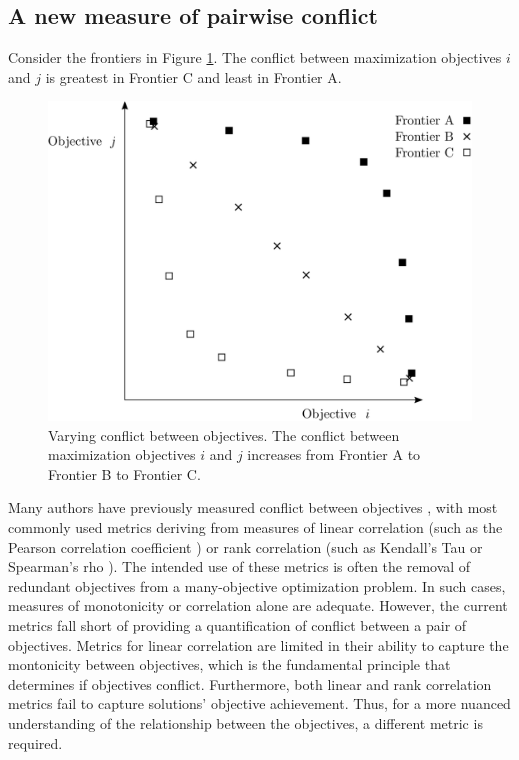 \subsection{A new measure of pairwise conflict}
\label{sec:newConflictMetric}
Consider the frontiers in Figure \ref{fig:ConflictVariesExample}. The conflict between maximization objectives $i$ and $j$ is greatest in Frontier C and least in Frontier A.
\begin{figure}[ht]
\centering
\includegraphics[width=.6\textwidth]{../images/ConflictVariesExample}
\caption[Example of varying conflict between objectives]{Varying conflict between objectives. The conflict between maximization objectives $i$ and $j$ increases from Frontier A to Frontier B to Frontier C.}
\label{fig:ConflictVariesExample}
\end{figure}

Many authors have previously measured conflict between objectives \cite{brockhoff2009objective}\cite{purshouse2003conflict}\cite{gal1977redundant}, with most commonly used metrics deriving from measures of linear correlation (such as the Pearson correlation coefficient \cite{deb2006searching}) or rank correlation (such as Kendall's Tau \cite{kanoulas2009empirical} or Spearman's rho \cite{karande2012application}%
). The intended use of these metrics is often the removal of redundant objectives from a many-objective optimization problem. In such cases, measures of monotonicity or correlation alone are adequate. However, the current metrics fall short of providing a quantification of conflict between a pair of objectives. Metrics for linear correlation are limited in their ability to capture the montonicity between objectives, which is the fundamental principle that determines if objectives conflict. Furthermore, both linear and rank correlation metrics fail to capture solutions' objective achievement. Thus, for a more nuanced understanding of the relationship between the objectives, a different metric is required.

